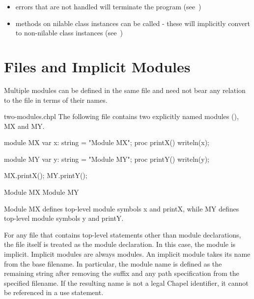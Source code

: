 \begin{itemize}

  \item errors that are not handled will terminate the program
        (see~)

  \item methods on nilable class instances can be called - these will
        implicitly convert to non-nilable class instances
        (see~)

\end{itemize}

\section{Files and Implicit Modules}
\label{Implicit_Modules}

Multiple modules can be defined in the same file and need not bear any
relation to the file in terms of their names.

\begin{chapelexample}{two-modules.chpl}
The following file contains two explicitly named modules
(), MX and MY.
\begin{chapel}
module MX {
  var x: string = "Module MX";
  proc printX() {
    writeln(x);
  }
}

module MY {
  var y: string = "Module MY";
  proc printY() {
    writeln(y);
  }
}
\end{chapel}
\begin{chapelpost}
MX.printX();
MY.printY();
\end{chapelpost}
\begin{chapeloutput}
Module MX
Module MY
\end{chapeloutput}
Module MX defines top-level module symbols x and printX, while MY
defines top-level module symbols y and printY.
\end{chapelexample}

For any file that contains top-level statements other than module
declarations, the file itself is treated as the module declaration.
In this case,
the module is implicit. Implicit modules are always 
modules. An implicit module takes its name from the base filename.  In
particular, the module name is defined as the remaining string after
removing the  suffix and any path specification from the
specified filename.  If the resulting name is not a legal Chapel
identifier, it cannot be referenced in a use statement.

